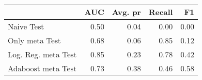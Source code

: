 \begin{tabular}{lrrrr}
\toprule
{} &   AUC &  Avg. pr &  Recall &    F1 \\
\midrule
Naive Test          &  0.50 &     0.04 &    0.00 &  0.00 \\
Only meta Test      &  0.68 &     0.06 &    0.85 &  0.12 \\
Log. Reg. meta Test &  0.85 &     0.23 &    0.78 &  0.42 \\
Adaboost meta Test  &  0.73 &     0.38 &    0.46 &  0.58 \\
\bottomrule
\end{tabular}
